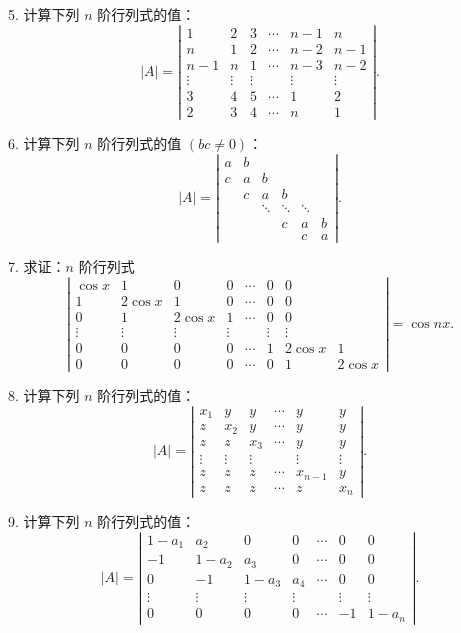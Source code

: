 \documentclass[UTF8, 12pt, fontset=fandol, oneside]{ctexart}
\begin{document}
5. 计算下列 $n$ 阶行列式的值：
\[
|A|=
\left|\begin{array}{cccccc}
1&2&3&\cdots&n-1&n\\
n&1&2&\cdots&n-2&n-1\\
n-1&n&1&\cdots&n-3&n-2\\
\vdots&\vdots&\vdots&&\vdots&\vdots\\
3&4&5&\cdots&1&2\\
2&3&4&\cdots&n&1
\end{array}\right|.
\]

6. 计算下列 $n$ 阶行列式的值 $(bc\ne0)$：
\[
|A|=
\left|\begin{array}{cccccc}
a&b&&&&\\
c&a&b&&&\\
&c&a&b&&\\
&&\ddots&\ddots&\ddots&\\
&&&c&a&b\\
&&&&c&a
\end{array}\right|.
\]

7. 求证：$n$ 阶行列式
\[
\left|\begin{array}{cccccccc}
\cos x&1&0&0&\cdots&0&0\\
1&2\cos x&1&0&\cdots&0&0\\
0&1&2\cos x&1&\cdots&0&0\\
\vdots&\vdots&\vdots&\vdots&&\vdots&\vdots\\
0&0&0&0&\cdots&1&2\cos x&1\\
0&0&0&0&\cdots&0&1&2\cos x
\end{array}\right|=\cos nx.
\]

8. 计算下列 $n$ 阶行列式的值：
\[
|A|=
\left|\begin{array}{cccccc}
x_1&y&y&\cdots&y&y\\
z&x_2&y&\cdots&y&y\\
z&z&x_3&\cdots&y&y\\
\vdots&\vdots&\vdots&&\vdots&\vdots\\
z&z&z&\cdots&x_{n-1}&y\\
z&z&z&\cdots&z&x_n
\end{array}\right|.
\]

9. 计算下列 $n$ 阶行列式的值：
\[
|A|=
\left|\begin{array}{ccccccc}
1-a_1&a_2&0&0&\cdots&0&0\\
-1&1-a_2&a_3&0&\cdots&0&0\\
0&-1&1-a_3&a_4&\cdots&0&0\\
\vdots&\vdots&\vdots&\vdots&&\vdots&\vdots\\
0&0&0&0&\cdots&-1&1-a_n
\end{array}\right|.
\]
\end{document}
